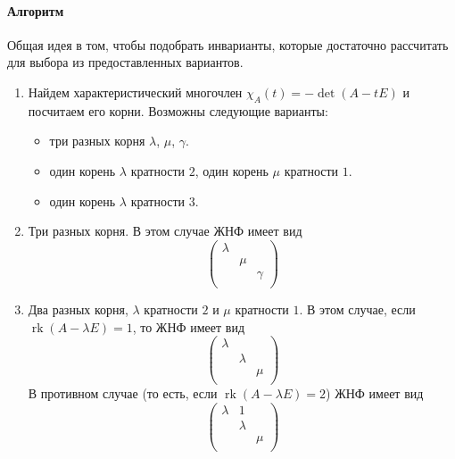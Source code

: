 \documentclass{article}
\newcommand{\rk}{\operatorname{rk}}
\begin{document}
\paragraph{Алгоритм}

Общая идея в том, чтобы подобрать инварианты, которые достаточно рассчитать для выбора из предоставленных вариантов.
\begin{enumerate}
\item Найдем характеристический многочлен $\chi_A(t) = - \det(A - tE)$ и посчитаем его корни.
Возможны следующие варианты:
\begin{itemize}
\item три разных корня $\lambda$, $\mu$, $\gamma$.

\item один корень $\lambda$ кратности $2$, один корень $\mu$ кратности $1$.

\item один корень $\lambda$ кратности $3$.
\end{itemize}

\item Три разных корня.
В этом случае ЖНФ имеет вид
\[
\begin{pmatrix}
{\lambda}&{}&{}\\
{}&{\mu}&{}\\
{}&{}&{\gamma}\\
\end{pmatrix}
\]

\item Два разных корня, $\lambda$ кратности $2$ и $\mu$ кратности $1$.
В этом случае, если $\rk (A - \lambda E) = 1$, то ЖНФ имеет вид
\[
\begin{pmatrix}
{\lambda}&{}&{}\\
{}&{\lambda}&{}\\
{}&{}&{\mu}\\
\end{pmatrix}
\]
В противном случае (то есть, если $\rk(A-\lambda E) = 2$) ЖНФ имеет вид
\[
\begin{pmatrix}
{\lambda}&{1}&{}\\
{}&{\lambda}&{}\\
{}&{}&{\mu}\\
\end{pmatrix}
\]


\end{enumerate}
\end{document}
